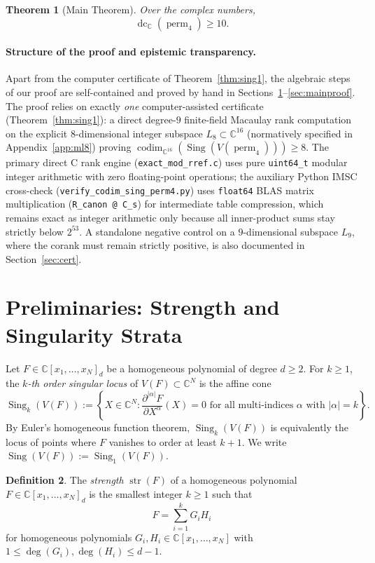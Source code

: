 \documentclass[11pt,a4paper]{article}
\newtheorem{theorem}{Theorem}[section]
\theoremstyle{definition}
\newtheorem{definition}[theorem]{Definition}
\DeclareMathOperator{\perm}{perm}
\DeclareMathOperator{\dc}{dc}
\DeclareMathOperator{\codim}{codim}
\DeclareMathOperator{\Sing}{Sing}
\DeclareMathOperator{\str}{str}
\begin{document}
\begin{theorem}[Main Theorem]\label{thm:main}
Over the complex numbers,
\[
  \dc_{\mathbb{C}}(\perm_4) \ge 10.
\]
\end{theorem}

\paragraph{Structure of the proof and epistemic transparency.}
Apart from the computer certificate of Theorem~\ref{thm:sing1}, the algebraic steps of our proof are self-contained and proved by hand in Sections~\ref{sec:sing2}--\ref{sec:mainproof}. The proof relies on exactly \emph{one} computer-assisted certificate (Theorem~\ref{thm:sing1}): a direct degree-$9$ finite-field Macaulay rank computation on the explicit $8$-dimensional integer subspace $L_8 \subset \mathbb{C}^{16}$ (normatively specified in Appendix~\ref{app:ml8}) proving $\codim_{\mathbb{C}^{16}}(\Sing(V(\perm_4))) \ge 8$. The primary direct C rank engine (\texttt{exact\_mod\_rref.c}) uses pure \texttt{uint64\_t} modular integer arithmetic with zero floating-point operations; the auxiliary Python IMSC cross-check (\texttt{verify\_codim\_sing\_perm4.py}) uses \texttt{float64} BLAS matrix multiplication (\texttt{R\_canon @ C\_s}) for intermediate table compression, which remains exact as integer arithmetic only because all inner-product sums stay strictly below $2^{53}$. A standalone negative control on a $9$-dimensional subspace $L_9$, where the corank must remain strictly positive, is also documented in Section~\ref{sec:cert}.

\section{Preliminaries: Strength and Singularity Strata}\label{sec:sing2}

Let $F \in \mathbb{C}[x_1,\dots,x_N]_d$ be a homogeneous polynomial of degree $d \ge 2$.
For $k \ge 1$, the \emph{$k$-th order singular locus} of $V(F) \subset \mathbb{C}^N$ is the affine cone
\[
  \Sing_k(V(F)) := \left\{ X \in \mathbb{C}^N : \frac{\partial^{|\alpha|} F}{\partial X^\alpha}(X) = 0 \text{ for all multi-indices } \alpha \text{ with } |\alpha| = k \right\}.
\]
By Euler's homogeneous function theorem, $\Sing_k(V(F))$ is equivalently the locus of points where $F$ vanishes to order at least $k+1$. We write $\Sing(V(F)) := \Sing_1(V(F))$.

\begin{definition}
The \emph{strength} $\str(F)$ of a homogeneous polynomial $F \in \mathbb{C}[x_1,\dots,x_N]_d$ is the smallest integer $k \ge 1$ such that
\[
  F = \sum_{i=1}^k G_i H_i
\]
for homogeneous polynomials $G_i, H_i \in \mathbb{C}[x_1,\dots,x_N]$ with $1 \le \deg(G_i), \deg(H_i) \le d - 1$.
\end{definition}
\end{document}
